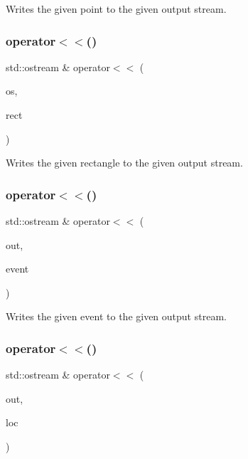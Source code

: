 Writes the given point to the given output stream. 

\mbox{\label{namespacesgl_ac0143d0e61dc696931075654778c005f}} 
\subsubsection{\texorpdfstring{operator$<$$<$()}{operator<<()}\hspace{0.1cm}{\footnotesize\ttfamily [3/6]}}
{\footnotesize\ttfamily std\+::ostream \& operator$<$$<$ (\begin{DoxyParamCaption}\item[{std\+::ostream \&}]{os,  }\item[{const \mbox{\hyperlink{structsgl_1_1GRectangle}{G\+Rectangle}} \&}]{rect }\end{DoxyParamCaption})}



Writes the given rectangle to the given output stream. 

\mbox{\label{namespacesgl_add0c51246248c751e59934f8c3410a3d}} 
\subsubsection{\texorpdfstring{operator$<$$<$()}{operator<<()}\hspace{0.1cm}{\footnotesize\ttfamily [4/6]}}
{\footnotesize\ttfamily std\+::ostream \& operator$<$$<$ (\begin{DoxyParamCaption}\item[{std\+::ostream \&}]{out,  }\item[{const \mbox{\hyperlink{classsgl_1_1GEvent}{G\+Event}} \&}]{event }\end{DoxyParamCaption})}



Writes the given event to the given output stream. 

\mbox{\label{namespacesgl_ac8051b8ea11152c22013763b86f08a98}} 
\subsubsection{\texorpdfstring{operator$<$$<$()}{operator<<()}\hspace{0.1cm}{\footnotesize\ttfamily [5/6]}}
{\footnotesize\ttfamily std\+::ostream \& operator$<$$<$ (\begin{DoxyParamCaption}\item[{std\+::ostream \&}]{out,  }\item[{const \mbox{\hyperlink{structsgl_1_1GTableIndex}{G\+Table\+Index}} \&}]{loc }\end{DoxyParamCaption})}




